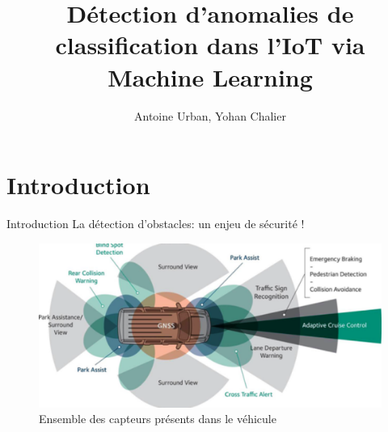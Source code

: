 \documentclass[usenames,dvipsnames]{beamer}
\title{Détection d'anomalies de classification dans l'IoT via Machine Learning}
\author{Antoine Urban, Yohan Chalier}
\institute{Projet de filière SR2I \\ Télécom ParisTech}
\begin{document}
\begin{frame}
\titlepage
\end{frame}

\section{Introduction}

\begin{frame}{Introduction}
La détection d'obstacles: un enjeu de sécurité !
\begin{figure}
\centering
\includegraphics[width=.8\textwidth]{img/sensors.png}
\caption{Ensemble des capteurs présents dans le véhicule}
\end{figure}
\end{frame}
\end{document}
